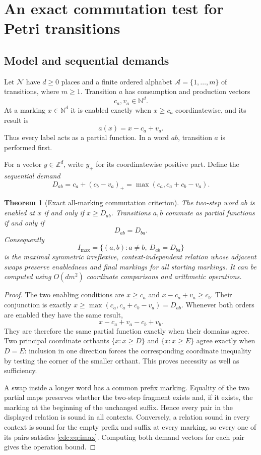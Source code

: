 \documentclass[11pt,a4paper]{article}
\newtheorem{theorem}{Theorem}[section]
\theoremstyle{definition}
\theoremstyle{remark}
\newcommand{\N}{\mathbb N}
\newcommand{\Z}{\mathbb Z}
\newcommand{\A}{\mathcal A}
\newcommand{\Net}{\mathcal N}
\newcommand{\srctag}[1]{\texorpdfstring{\hspace{0.5em}{\normalfont\small\color{accent}[#1]}}{ [#1]}}
\begin{document}
\section{An exact commutation test for Petri transitions\srctag{05}}
\label{cdc:sec:commutation}
\subsection{Model and sequential demands}
Let $\Net$ have $d\ge0$ places and a finite ordered alphabet
$\A=\{1,\ldots,m\}$ of transitions, where $m\ge1$. Transition $a$ has consumption and production vectors
\[
c_a,v_a\in\N^d.
\]
At a marking $x\in\N^d$ it is enabled exactly when $x\ge c_a$ coordinatewise, and its result is
\[
a(x)=x-c_a+v_a.
\]
Thus every label acts as a partial function. In a word $ab$, transition $a$ is performed first.

For a vector $y\in\Z^d$, write $y_+$ for its coordinatewise positive part. Define the \emph{sequential demand}
\begin{equation}\label{cdc:eq:demand}
D_{ab}=c_a+(c_b-v_a)_+
      =\max(c_a,c_a+c_b-v_a).
\end{equation}

\begin{theorem}[Exact all-marking commutation criterion]\label{cdc:thm:commute}
The two-step word $ab$ is enabled at $x$ if and only if $x\ge D_{ab}$. Transitions $a,b$ commute as partial functions if and only if
\begin{equation}\label{cdc:eq:imax}
D_{ab}=D_{ba}.
\end{equation}
Consequently
\[
I_{\max}=\{(a,b):a\ne b,\ D_{ab}=D_{ba}\}
\]
is the maximal symmetric irreflexive, context-independent relation whose adjacent swaps preserve enabledness and final markings for all starting markings. It can be computed using $O(dm^2)$ coordinate comparisons and arithmetic operations.
\end{theorem}
\begin{proof}
The two enabling conditions are $x\ge c_a$ and
$x-c_a+v_a\ge c_b$. Their conjunction is exactly
$x\ge\max(c_a,c_a+c_b-v_a)=D_{ab}$. Whenever both orders are enabled they have the same result,
\[
x-c_a+v_a-c_b+v_b.
\]
They are therefore the same partial function exactly when their domains agree. Two principal coordinate orthants $\{x:x\ge D\}$ and $\{x:x\ge E\}$ agree exactly when $D=E$: inclusion in one direction forces the corresponding coordinate inequality by testing the corner of the smaller orthant. This proves necessity as well as sufficiency.

A swap inside a longer word has a common prefix marking. Equality of the two partial maps preserves whether the two-step fragment exists and, if it exists, the marking at the beginning of the unchanged suffix. Hence every pair in the displayed relation is sound in all contexts. Conversely, a relation sound in every context is sound for the empty prefix and suffix at every marking, so every one of its pairs satisfies \eqref{cdc:eq:imax}. Computing both demand vectors for each pair gives the operation bound.
\end{proof}
\end{document}
